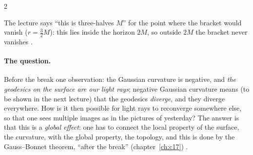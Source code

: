 \begin{paracol}{2}
\begin{coursenote}
The lecture says ``this is three-halves $M$'' for the point where the bracket would vanish ($r=\tfrac32M$): this lies inside the horizon $2M$, so outside $2M$ the bracket never vanishes .
\end{coursenote}

\paragraph{The question.} Before the break one observation: the Gaussian curvature is negative, and \emph{the geodesics on the surface are our light rays}; negative Gaussian curvature means (to be shown in the next lecture) that the geodesics \emph{diverge}, and they diverge everywhere. How is it then possible for light rays to reconverge somewhere else, so that one sees multiple images as in the pictures of yesterday? The answer is that this is a \emph{global effect}: one has to connect the local property of the surface, the curvature, with the global property, the topology, and this is done by the Gauss--Bonnet theorem, ``after the break'' (chapter~\ref{ch:c17}) .


\end{paracol}
